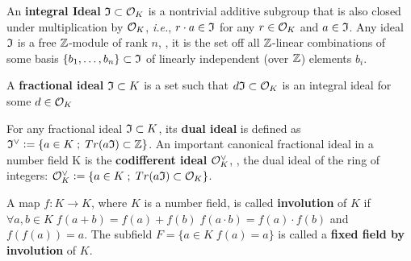 \documentclass[a4paper,12pt]{article}
\begin{document}
\begin{definition}
  An \textbf{integral Ideal} $\mathfrak{I} \subset \mathcal{O}_K$ is a  nontrivial additive subgroup that
  is also closed under multiplication by $\mathcal{O}_K$, \textit{i.e.}, $r \cdot a \in \mathfrak{I}$ for
  any $r \in \mathcal{O}_K$ and $a \in \mathfrak{I}$. Any ideal $\mathfrak{I}$ is a free $\mathbb{Z}$-module of rank
  $n$, \ie, it is the set off all $\mathbb{Z}$-linear combinations of some basis
  $\{b_1,\dots,b_n\} \subset \mathfrak{I}$  of linearly independent (over $\mathbb{Z}$) elements $b_i$.
\end{definition}

\begin{definition}
  A \textbf{fractional ideal} $\mathfrak{I} \subset K$ is a set such that $d\mathfrak{I} \subset \mathcal{O}_K$ is an
  integral ideal for some $d \in \mathcal{O}_K$
\end{definition}

\begin{definition}
  For any fractional ideal $\mathfrak{I} \subset K$, its \textbf{dual ideal} is defined as
  $\mathfrak{I}^\vee \vcentcolon = \{ a \in K \;;\; Tr(a\mathfrak{I}) \subset \mathbb{Z} \}$. An important canonical
  fractional ideal in a number field K is the \textbf{codifferent ideal}
  $\mathcal{O}_K^\vee$, \ie, the dual ideal of the ring of integers: $\mathcal{O}_K^\vee \vcentcolon = \{ a \in K \;;\; Tr(a\mathfrak{I}) \subset \mathcal{O}_K \}$.
\end{definition}

   \begin{definition}
\label{definition:fixed-field-by-involution}
     A map $f: K \rightarrow K$, where $K$ is a number field, is called \textbf{involution}
     of $K$ if $\forall a,b \in K \; f(a+b) = f(a) + f(b) \; f(a \cdot b) = f(a) \cdot f(b)$ and
     $f(f(a)) = a$. The subfield $F = \{a \in K \; f(a) = a\}$ is called a \textbf{fixed field by
       involution} of $K$.
   \end{definition}
\end{document}
